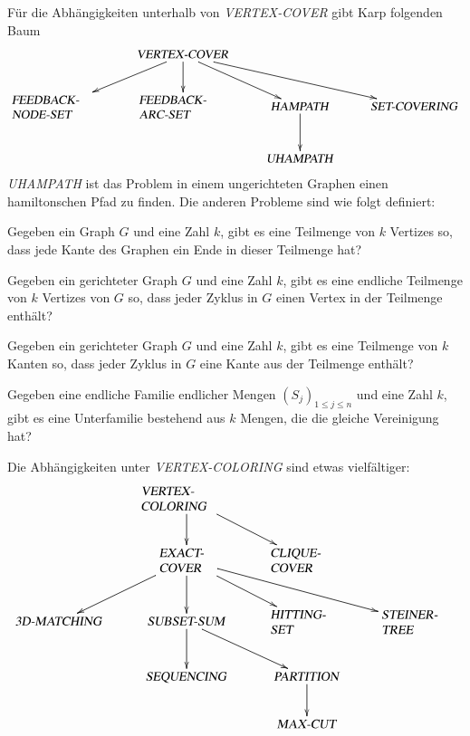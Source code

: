 Für die Abhängigkeiten unterhalb von \textsl{VERTEX-COVER} gibt 
Karp folgenden Baum
\[
\xymatrix{
	&\text{\textsl{VERTEX-COVER}} \ar[dl] \ar[d]\ar[dr]\ar[drr]
\\
\begin{minipage}{1.0truein}
\textsl{FEEDBACK-NODE-SET}
\end{minipage}
	&\begin{minipage}{1.0truein}\textsl{FEEDBACK-ARC-SET}\end{minipage}
		&\text{\textsl{HAMPATH}}\ar[d]
			&\text{\textsl{SET-COVERING}}
\\
	&
		&\text{\textsl{UHAMPATH}}
}
\]
\textsl{UHAMPATH} ist das Problem in einem ungerichteten Graphen
einen hamiltonschen Pfad zu finden. Die anderen Probleme sind wie
folgt definiert:
\begin{description}
%
\item[\textsl{VERTEX-COVER}:] Gegeben ein Graph $G$ und eine Zahl
$k$, gibt es eine Teilmenge von $k$ Vertizes so, dass jede
Kante des Graphen ein Ende in dieser Teilmenge hat?
%
\item[\textsl{FEEDBACK-NODE-SET}:] Gegeben ein gerichteter Graph $G$
und eine Zahl $k$, gibt es eine endliche Teilmenge von $k$ Vertizes
von $G$ so, dass jeder Zyklus in $G$ einen Vertex in der Teilmenge 
enthält?
%
\item[\textsl{FEEDBACK-ARC-SET}:] Gegeben ein gerichteter Graph $G$
und eine Zahl $k$, gibt es eine Teilmenge von $k$ Kanten so, dass
jeder Zyklus in $G$ eine Kante aus der Teilmenge enthält?
%
\item[\textsl{SET-COVERING}:] Gegeben eine endliche Familie endlicher
Mengen $(S_j)_{1\le j\le n}$ und eine Zahl $k$, gibt es eine Unterfamilie
bestehend aus $k$ Mengen, die die gleiche Vereinigung hat?
\end{description}
Die Abhängigkeiten unter \textsl{VERTEX-COLORING} sind etwas vielfältiger:
\[
\xymatrix{
	&\begin{minipage}{1truein}
	\textsl{VERTEX-COLORING}
	\end{minipage} \ar[d]\ar[dr]
\\
	&\begin{minipage}{0.6truein}
	\textsl{EXACT-COVER}
	\end{minipage} \ar[dl] \ar[d] \ar[dr] \ar[drr]
		&\begin{minipage}{0.8truein}
		\textsl{CLIQUE-COVER}
		\end{minipage} 
\\
\text{\textsl{3D-MATCHING}}
	&\text{\textsl{SUBSET-SUM}} \ar[dr] \ar[d]
		&\begin{minipage}{0.8truein}
		\textsl{HITTING-SET}
		\end{minipage}
			&\begin{minipage}{0.8truein}
			\textsl{STEINER-TREE}
			\end{minipage}
\\
	&\text{\textsl{SEQUENCING}}
		&\text{\textsl{PARTITION}} \ar[d]
\\
	&
		&\text{\textsl{MAX-CUT}}
}
\]
